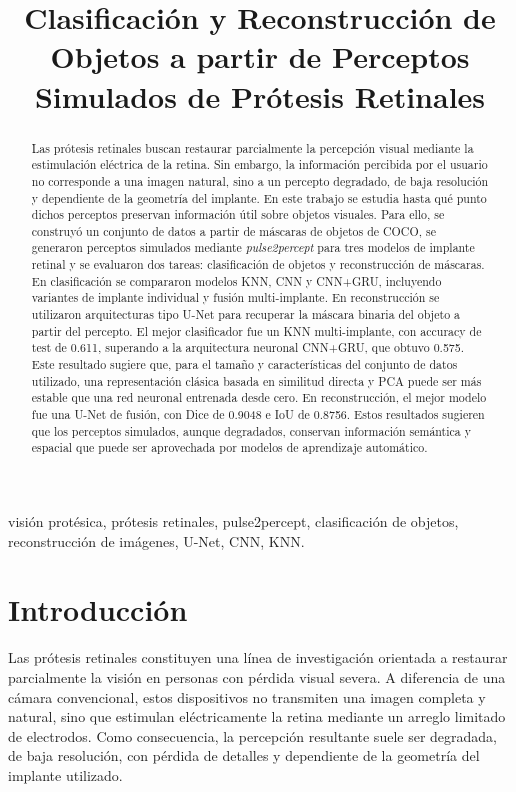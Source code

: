 \documentclass[conference,a4paper]{IEEEtran}
\title{Clasificación y Reconstrucción de Objetos a partir de Perceptos Simulados de Prótesis Retinales}
\author{
\IEEEauthorblockN{Joel Jablonski}
\IEEEauthorblockA{
Universidad de San Andrés \\
Email: jjablonski@udesa.edu.ar}
\and
\IEEEauthorblockN{Estanislao Molina Abeniacar}
\IEEEauthorblockA{
Universidad de San Andrés \\
Email: emolinaabeniacar@udesa.edu.ar}
}
\begin{document}
\maketitle

\begin{abstract}
Las prótesis retinales buscan restaurar parcialmente la percepción visual mediante la estimulación eléctrica de la retina. Sin embargo, la información percibida por el usuario no corresponde a una imagen natural, sino a un percepto degradado, de baja resolución y dependiente de la geometría del implante. En este trabajo se estudia hasta qué punto dichos perceptos preservan información útil sobre objetos visuales. Para ello, se construyó un conjunto de datos a partir de máscaras de objetos de COCO, se generaron perceptos simulados mediante \textit{pulse2percept} para tres modelos de implante retinal y se evaluaron dos tareas: clasificación de objetos y reconstrucción de máscaras. En clasificación se compararon modelos KNN, CNN y CNN+GRU, incluyendo variantes de implante individual y fusión multi-implante. En reconstrucción se utilizaron arquitecturas tipo U-Net para recuperar la máscara binaria del objeto a partir del percepto. El mejor clasificador fue un KNN multi-implante, con accuracy de test de 0.611, superando a la arquitectura neuronal CNN+GRU, que obtuvo 0.575. Este resultado sugiere que, para el tamaño y características del conjunto de datos utilizado, una representación clásica basada en similitud directa y PCA puede ser más estable que una red neuronal entrenada desde cero. En reconstrucción, el mejor modelo fue una U-Net de fusión, con Dice de 0.9048 e IoU de 0.8756. Estos resultados sugieren que los perceptos simulados, aunque degradados, conservan información semántica y espacial que puede ser aprovechada por modelos de aprendizaje automático.
\end{abstract}

\begin{IEEEkeywords}
visión protésica, prótesis retinales, pulse2percept, clasificación de objetos, reconstrucción de imágenes, U-Net, CNN, KNN.
\end{IEEEkeywords}

\section{Introducción}

Las prótesis retinales constituyen una línea de investigación orientada a restaurar parcialmente la visión en personas con pérdida visual severa. A diferencia de una cámara convencional, estos dispositivos no transmiten una imagen completa y natural, sino que estimulan eléctricamente la retina mediante un arreglo limitado de electrodos. Como consecuencia, la percepción resultante suele ser degradada, de baja resolución, con pérdida de detalles y dependiente de la geometría del implante utilizado.
\end{document}
